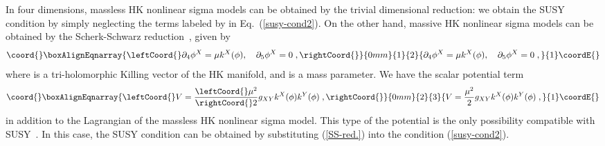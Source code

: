 \documentclass[a4paper,12pt]{article}
\begin{document}
In four dimensions, 
massless HK nonlinear sigma models can be obtained by 
the trivial dimensional reduction:   
we obtain the SUSY condition by simply 
neglecting the terms labeled by \coordHE{} in Eq.~(\ref{susy-cond2}).  
On the other hand, massive HK nonlinear sigma models 
can be obtained by the Scherk-Schwarz reduction~\cite{AF1,Sierra,Townsend1}, 
given by  
\begin{eqnarray}\coord{}\boxAlignEqnarray{\leftCoord{}
  \partial_4\phi^X = \mu k^X(\phi), \quad \partial_5\phi^X = 0\;, 
 \label{SS-red.}
\rightCoord{}}{0mm}{1}{2}{
  \partial_4\phi^X = \mu k^X(\phi), \quad \partial_5\phi^X = 0\;, 
 }{1}\coordE{}\end{eqnarray}
where \coordHE{} is a tri-holomorphic Killing vector of 
the HK manifold, and \myHighlight{$\mu$}\coordHE{} is a mass parameter. 
We have the scalar potential term  
\begin{eqnarray}\coord{}\boxAlignEqnarray{\leftCoord{}
  V = \frac{\leftCoord{}\mu^2}{\rightCoord{}2}g_{XY}k^X (\phi) k^Y (\phi) \;,
 \label{HK-pot.}
\rightCoord{}}{0mm}{2}{3}{
  V = \frac{\mu^2}{2}g_{XY}k^X (\phi) k^Y (\phi) \;,
 }{1}\coordE{}\end{eqnarray}
in addition to the Lagrangian of the massless HK nonlinear sigma model. 
This type of the potential is the only possibility 
compatible with \coordHE{} SUSY~\cite{Townsend1}.
In this case, the SUSY condition can be obtained by 
substituting (\ref{SS-red.}) into the condition (\ref{susy-cond2}).

\end{document}
